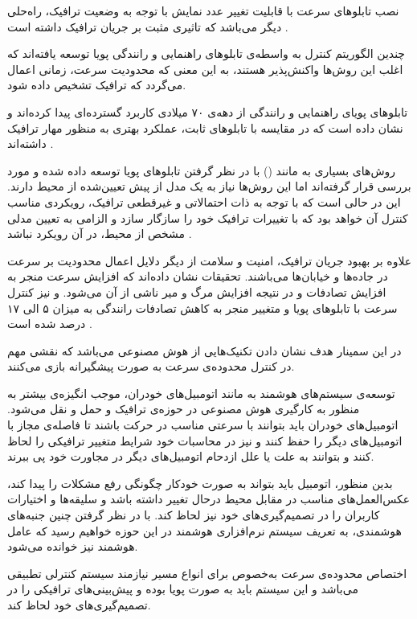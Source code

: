 نصب تابلوهای سرعت با قابلیت تغییر عدد نمایش با توجه به وضعیت ترافیک، راه‌حلی دیگر می‌باشد که تاثیری مثبت بر جریان ترافیک داشته است \cite{Papageorgiou2008}. 

چندین الگوریتم کنترل به واسطه‌ی تابلو‌های راهنمایی و رانندگی پویا توسعه یافته‌اند که اغلب این روش‌ها واکنش‌پذیر هستند، به این معنی که محدودیت سرعت، زمانی اعمال می‌گردد که ترافیک تشخیص داده شود.

تابلو‌های پویای راهنمایی و رانندگی از دهه‌ی ۷۰ میلادی کاربرد گسترده‌ای پیدا کرده‌اند و نشان داده است که در مقایسه با تابلوهای ثابت، عملکرد بهتری به منظور مهار ترافیک داشته‌اند \cite{Touhbi2017}.

روش‌های بسیاری به مانند () با در نظر گرفتن تابلوهای پویا توسعه داده شده و مورد بررسی قرار گرفته‌اند اما این روش‌ها نیاز به یک مدل از پیش تعیین‌شده از محیط دارند.
این در حالی است که با توجه به ذات احتمالاتی و غیرقطعی ترافیک، رویکردی مناسب کنترل آن خواهد بود که با تغییرات ترافیک خود را سازگار سازد و الزامی به تعیین مدلی مشخص از محیط، در آن رویکرد نباشد \cite{Touhbi2017}.

علاوه بر بهبود جریان ترافیک، امنیت و سلامت از دیگر دلایل اعمال محدودیت بر سرعت در جاده‌ها و خیابان‌ها می‌باشند.
تحقیقات نشان داده‌اند که افزایش سرعت منجر به افزایش تصادفات و در نتیجه افزایش مرگ و میر ناشی از آن می‌شود.
و نیز کنترل سرعت با تابلو‌های پویا و متغییر منجر به کاهش تصادفات رانندگی به میزان ۵ الی ۱۷ درصد شده است \cite{Zhu2014}.

در این سمینار هدف نشان دادن تکنیک‌هایی از هوش مصنوعی می‌باشد که نقشی مهم در کنترل محدوده‌ی سرعت به صورت پیشگیرانه بازی می‌کنند.

توسعه‌ی سیستم‌های هوشمند به مانند اتومبیل‌های خودران، موجب انگیزه‌ی بیشتر به منظور به کارگیری هوش مصنوعی در حوزه‌ی ترافیک و حمل و نقل می‌شود.
اتومبیل‌های خودران باید بتوانند با سرعتی مناسب در حرکت باشند تا فاصله‌ی مجاز با اتومبیل‌های دیگر را حفظ کنند و نیز در محاسبات خود شرایط متغییر ترافیکی را لحاظ کنند و بتوانند به علت یا علل  ازدحام اتومبیل‌های دیگر در مجاورت خود پی ببرند\cite{Walraven2016}.

بدین منظور، اتومبیل باید بتواند به صورت خودکار چگونگی رفع مشکلات را پیدا کند، عکس‌العمل‌های مناسب در مقابل محیط درحال تغییر داشته باشد و سلیقه‌ها و اختیارات کاربران را در تصمیم‌گیری‌های خود نیز لحاظ کند.
با در نظر گرفتن چنین جنبه‌های هوشمندی، به تعریف سیستم نرم‌افزاری هوشمند در این حوزه خواهیم رسید که عامل هوشمند نیز خوانده می‌شود. 

اختصاص محدوده‌ی سرعت به‌خصوص برای انواع مسیر نیازمند سیستم کنترلی تطبیقی می‌باشد و این سیستم باید به صورت پویا بوده و پیش‌بینی‌های ترافیکی را در تصمیم‌گیری‌های خود لحاظ کند.

